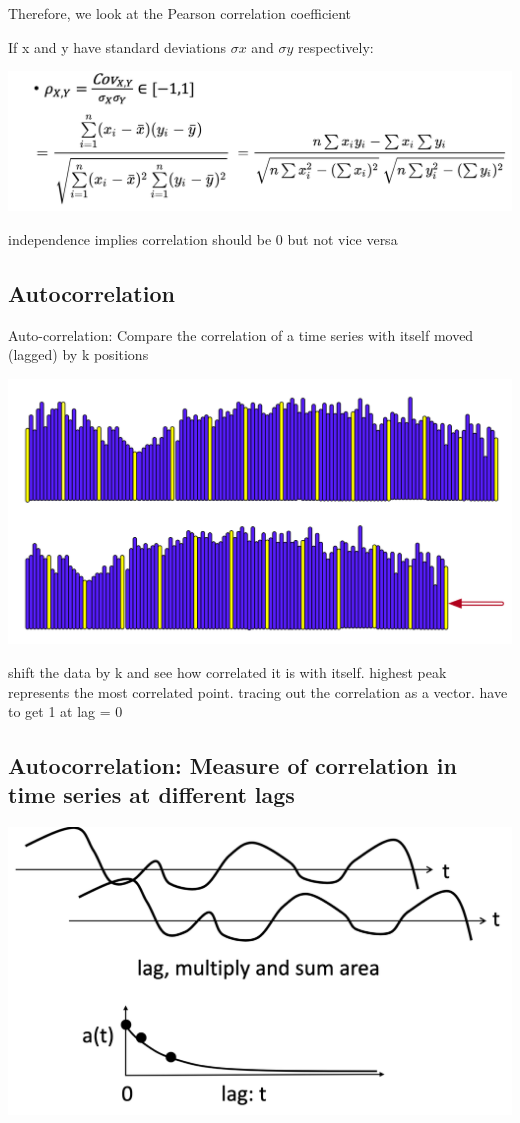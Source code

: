 \documentclass[11pt]{article}
\theoremstyle{definition}
\begin{document}
Therefore, we look at the Pearson correlation coefficient

If x and y have standard deviations $\sigma x$ and $\sigma y$ respectively:

\includegraphics[width=\textwidth/2]{6.png}

independence implies correlation should be 0 but not vice versa

\subsection{Autocorrelation}
Auto-correlation: Compare the correlation of a time series with itself
moved (lagged) by k positions

\includegraphics[width=\textwidth/2]{7.png}

shift the data by k and see how correlated it is with itself. highest peak represents
the most correlated point. tracing out the correlation as a vector. have to get 1 at lag = 0

\subsection{Autocorrelation:
Measure of correlation in time series
at different lags}
\includegraphics[width=\textwidth/2]{8.png}
\end{document}
